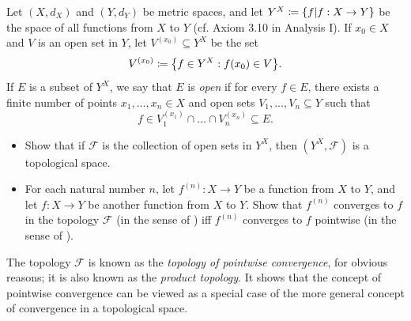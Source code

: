 \begin{ex}\label{ii:ex:3.4.4}
  Let \((X, d_X)\) and \((Y, d_Y)\) be metric spaces, and let \(Y^X \coloneqq \left\lbrace f | f : X \to Y \right\rbrace\) be the space of all functions from \(X\) to \(Y\)
  (cf. Axiom 3.10 in Analysis I).
  If \(x_0 \in X\) and \(V\) is an open set in \(Y\), let \(V^{(x_0)} \subseteq Y^X\) be the set
  \[
    V^{(x_0)} \coloneqq \set{f \in Y^X : f(x_0) \in V}.
  \]
  If \(E\) is a subset of \(Y^X\), we say that \(E\) is \emph{open} if for every \(f \in E\), there exists a finite number of points \(x_1, \dots, x_n \in X\) and open sets \(V_1, \dots, V_n \subseteq Y\) such that
  \[
    f \in V_1^{(x_1)} \cap \dots \cap V_n^{(x_n)} \subseteq E.
  \]
  \begin{itemize}
    \item Show that if \(\mathcal{F}\) is the collection of open sets in \(Y^X\), then \((Y^X , \mathcal{F})\) is a topological space.
    \item For each natural number \(n\), let \(f^{(n)} : X \to Y\) be a function from \(X\) to \(Y\), and let \(f : X \to Y\) be another function from \(X\) to \(Y\).
          Show that \(f^{(n)}\) converges to \(f\) in the topology \(\mathcal{F}\) (in the sense of ) iff \(f^{(n)}\) converges to \(f\) pointwise (in the sense of ).
  \end{itemize}
  The topology \(\mathcal{F}\) is known as the \emph{topology of pointwise convergence}, for obvious reasons;
  it is also known as the \emph{product topology}.
  It shows that the concept of pointwise convergence can be viewed as a special case of the more general concept of convergence in a topological space.
\end{ex}

